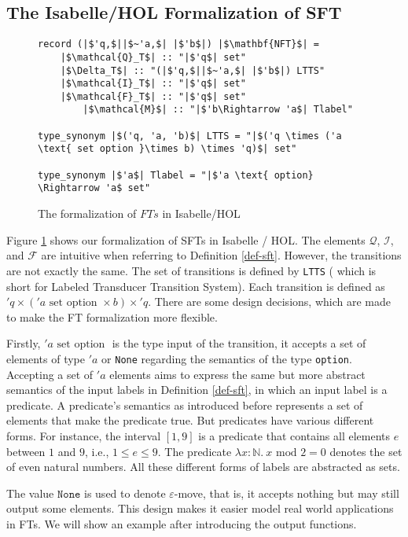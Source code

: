 \documentclass[a4paper,UKenglish,cleveref, autoref, thm-restate]{lipics-v2021}
\begin{document}
\subsection{The Isabelle/HOL Formalization of SFT}

\begin{figure}[t]
	\begin{lstlisting}
record (|$'q,$||$~'a,$| |$'b$|) |$\mathbf{NFT}$| =
	|$\mathcal{Q}_T$| :: "|$'q$| set"
	|$\Delta_T$| :: "(|$'q,$||$~'a,$| |$'b$|) LTTS"
	|$\mathcal{I}_T$| :: "|$'q$| set"
	|$\mathcal{F}_T$| :: "|$'q$| set"
        |$\mathcal{M}$| :: "|$'b\Rightarrow 'a$| Tlabel"
        
type_synonym |$('q, 'a, 'b)$| LTTS = "|$('q \times ('a \text{ set option }\times b) \times 'q)$| set"

type_synonym |$'a$| Tlabel = "|$'a \text{ option} \Rightarrow 'a$ set"
	\end{lstlisting}
\caption{The formalization of $FTs$ in Isabelle/HOL}
\label{fig-def-FT}
\end{figure}

Figure \ref{fig-def-FT} shows our formalization of SFTs in Isabelle / HOL. The elements $\mathcal{Q}$, $\mathcal{I}$, and $\mathcal{F}$ are intuitive when referring to Definition \ref{def-sft}. However, the transitions are not exactly the same. 
%
The set of transitions is defined by \texttt{LTTS} ( which is short for Labeled Transducer Transition System). Each transition is defined as $'q \times ('a \text{ set option }\times b) \times 'q$. There are some design decisions, which are made to make the FT formalization more flexible.

Firstly, $'a \text{ set option }$ is the type input of the transition, it accepts a set of elements of type $'a$ or \texttt{None} regarding the semantics of the type \texttt{option}. 
Accepting a set of $'a$ elements aims to express the same but more abstract semantics of the input labels in Definition \ref{def-sft}, in which an input label is a predicate. A predicate's semantics as introduced before represents a set of elements that make the predicate true. But predicates have various different forms. For instance, the interval $[1, 9]$ is a predicate that contains all elements $e$ between $1$ and $9$, i.e., $1 \leq e \leq 9$. The predicate $\lambda x : \mathbb{N}.~ x \text{ mod } 2 = 0$ denotes the set of even natural numbers. All these different forms of labels are abstracted as sets.

%
The value $\texttt{None}$ is used to denote $\varepsilon$-move, that is, it accepts nothing but may still output some elements. This design makes it easier model real world applications in FTs. We will show an example after introducing the output functions. 
\end{document}
